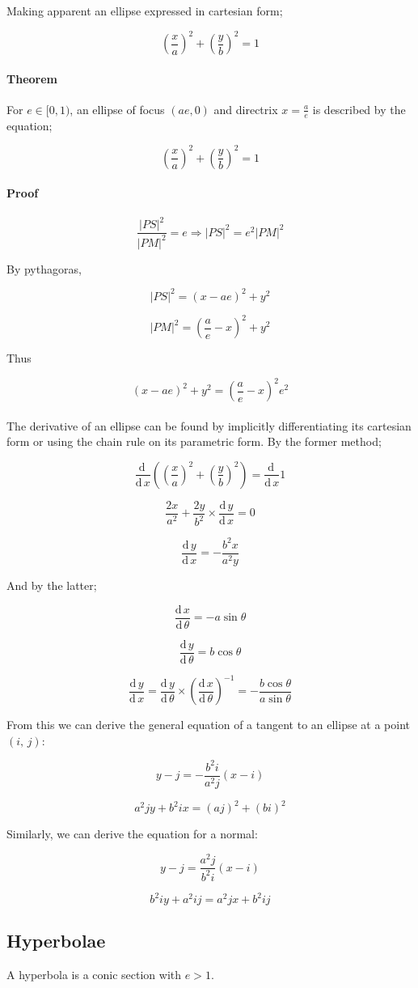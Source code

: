 \documentclass{article}
\newcommand{\de}{\textrm{d}\,}
\begin{document}
\noindent Making apparent an ellipse expressed in cartesian form;

\[\left(\frac{x}{a}\right)^2 + \left(\frac{y}{b}\right)^2 = 1\]

\paragraph{Theorem} For $e \in [0,1)$, an ellipse of focus $(ae, 0)$ and
directrix $x = \frac{a}{e}$ is described by the equation;

\[\left(\frac{x}{a}\right)^2 + \left(\frac{y}{b}\right)^2 = 1\]

\paragraph{Proof} 

\[\frac{|PS|^2}{|PM|^2} = e \Rightarrow |PS|^2 = e^2|PM|^2\]

\noindent By pythagoras,

\[|PS|^2 = \left(x - ae\right)^2 + y^2\]

\[|PM|^2 = \left(\frac{a}{e} - x\right)^2 + y^2\]

\noindent Thus

\[\left(x - ae\right)^2 + y^2 = \left(\frac{a}{e} - x\right)^2e^2\]\\

\noindent The derivative of an ellipse can be found by implicitly
differentiating its cartesian form or using the chain rule on its parametric
form. By the former method;

\[\frac{\de}{\de x} \left(\left(\frac{x}{a}\right)^2 +
\left(\frac{y}{b}\right)^2\right) = \frac{\de}{\de x}1\]

\[\frac{2x}{a^2} + \frac{2y}{b^2} \times \frac{\de y}{\de x} = 0\]

\[\frac{\de y}{\de x} = -\frac{b^2x}{a^2y}\]

\noindent And by the latter;

\[\frac{\de x}{\de \theta} = -a\sin\theta\]

\[\frac{\de y}{\de \theta} = b\cos\theta\]

\[\frac{\de y}{\de x} = \frac{\de y}{\de \theta} \times \left(\frac{\de x}{\de
\theta}\right)^{-1} = -\frac{b\cos\theta}{a\sin\theta}\]

\noindent From this we can derive the general equation of a tangent to an
ellipse at a point $\left(i,\, j\right)$:

\[y - j = -\frac{b^2i}{a^2j}\left(x - i\right)\]

\[a^2jy + b^2ix = \left(aj\right)^2 + \left(bi\right)^2\]

\noindent Similarly, we can derive the equation for a normal:

\[y - j = \frac{a^2j}{b^2i}\left(x - i\right)\]

\[b^2iy + a^2ij = a^2jx + b^2ij\]

\subsection{Hyperbolae}

A hyperbola is a conic section with $e > 1$.
\end{document}

